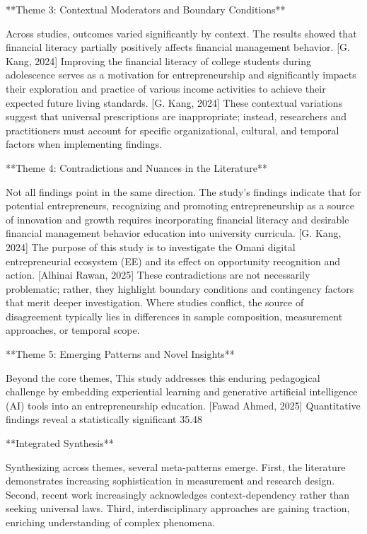 \documentclass[11pt, a4paper]{article}
\begin{document}
**Theme 3: Contextual Moderators and Boundary Conditions**

Across studies, outcomes varied significantly by context. The results showed that financial literacy partially positively affects financial management behavior. [G. Kang, 2024] Improving the financial literacy of college students during adolescence serves as a motivation for entrepreneurship and significantly impacts their exploration and practice of various income activities to achieve their expected future living standards. [G. Kang, 2024] These contextual variations suggest that universal prescriptions are inappropriate; instead, researchers and practitioners must account for specific organizational, cultural, and temporal factors when implementing findings.

**Theme 4: Contradictions and Nuances in the Literature**

Not all findings point in the same direction. The study’s findings indicate that for potential entrepreneurs, recognizing and promoting entrepreneurship as a source of innovation and growth requires incorporating financial literacy and desirable financial management behavior education into university curricula. [G. Kang, 2024] The purpose of this study is to investigate the Omani digital entrepreneurial ecosystem (EE) and its effect on opportunity recognition and action. [Alhinai Rawan, 2025] These contradictions are not necessarily problematic; rather, they highlight boundary conditions and contingency factors that merit deeper investigation. Where studies conflict, the source of disagreement typically lies in differences in sample composition, measurement approaches, or temporal scope.

**Theme 5: Emerging Patterns and Novel Insights**

Beyond the core themes, This study addresses this enduring pedagogical challenge by embedding experiential learning and generative artificial intelligence (AI) tools into an entrepreneurship education. [Fawad Ahmed, 2025] Quantitative findings reveal a statistically significant 35.48%

**Integrated Synthesis**

Synthesizing across themes, several meta-patterns emerge. First, the literature demonstrates increasing sophistication in measurement and research design. Second, recent work increasingly acknowledges context-dependency rather than seeking universal laws. Third, interdisciplinary approaches are gaining traction, enriching understanding of complex phenomena.
\end{document}

